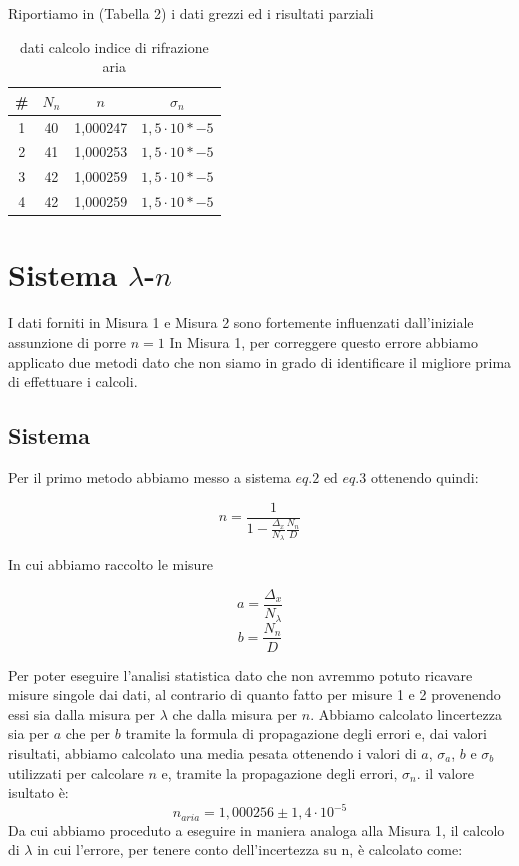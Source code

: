 \documentclass{article}
\begin{document}
Riportiamo in (Tabella 2) i dati grezzi ed i risultati parziali


\begin{table}[h!]
\centering
\begin{tabular}{ | c | c | c | c | }
\hline
 \# & $N_n$ & $n$ & $\sigma_n$\\
\hline
   1 & 40 & 1,000247 & $1,5 \cdot 10*{-5}$\\
   2 & 41 & 1,000253 & $1,5 \cdot 10*{-5}$\\
   3 & 42 & 1,000259 & $1,5 \cdot 10*{-5}$\\
   4 & 42 & 1,000259 & $1,5 \cdot 10*{-5}$\\
\hline
\end{tabular}
\caption{dati calcolo indice di rifrazione aria}
\label{table:2}
\end{table}




\section{Sistema $\lambda$-$n$}
I dati forniti in Misura 1 e Misura 2 sono fortemente influenzati dall'iniziale assunzione di porre $n = 1$ In Misura 1, per correggere questo errore abbiamo applicato due metodi dato che non siamo in grado di identificare il migliore prima di effettuare i calcoli. 



\subsection{Sistema}
Per il primo metodo abbiamo messo a sistema $eq.2$ ed $eq.3$ ottenendo quindi:

\begin{equation} 
n= \frac{1}{1 - \frac{\Delta_x}{N_\lambda} \frac{N_n}{D}} 
\end{equation}

In cui abbiamo raccolto le misure

\[ a = \frac{\Delta_x}{N_\lambda} \]
\[ b = \frac{N_n}{D} \]

Per poter eseguire l'analisi statistica dato che non avremmo potuto ricavare misure singole dai dati, al contrario di quanto fatto per misure 1 e 2 provenendo essi sia dalla misura per $\lambda$ che dalla misura per $n$. Abbiamo calcolato lincertezza sia per $a$ che per $b$ tramite la formula di propagazione degli errori e, dai valori risultati, abbiamo calcolato una media pesata ottenendo i valori di $a$, $\sigma_a$, $b$ e $\sigma_b$ utilizzati per calcolare $n$ e, tramite la propagazione degli errori, $\sigma_n$. il valore isultato è:
\[ n_{aria} = 1,000256 \pm 1,4 \cdot 10^{-5} \]
Da cui abbiamo proceduto a eseguire in maniera analoga alla Misura 1, il calcolo di $\lambda$ in cui l'errore, per tenere conto dell'incertezza su n, è calcolato come:
\end{document}
